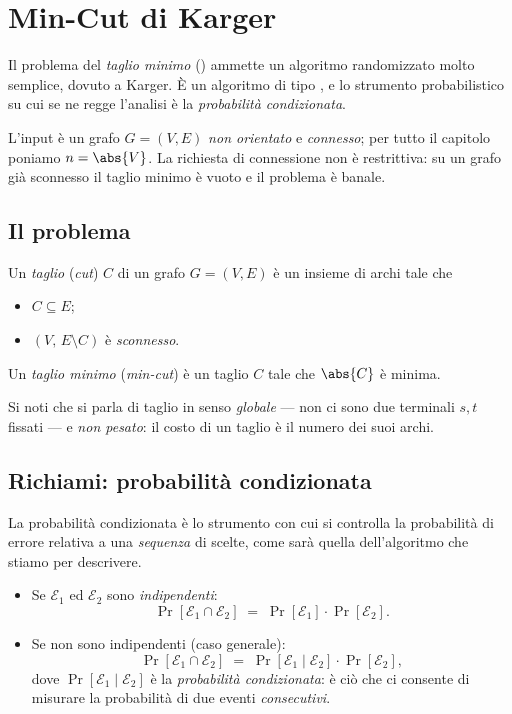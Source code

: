 \chapter{Min-Cut di Karger}

Il problema del \emph{taglio minimo} (\mincut) ammette un algoritmo randomizzato molto
semplice, dovuto a Karger. È un algoritmo di tipo \MonteCarlo, e lo strumento
probabilistico su cui se ne regge l'analisi è la \emph{probabilità condizionata}.

L'input è un grafo $G=(V,E)$ \emph{non orientato} e \emph{connesso}; per tutto il capitolo
poniamo $n=\abs{V}$. La richiesta di connessione non è restrittiva: su un grafo già
sconnesso il taglio minimo è vuoto e il problema è banale.

\section{Il problema}


\begin{definizione}[Taglio]\label{def:taglio}
Un \emph{taglio} (\emph{cut}) $C$ di un grafo $G=(V,E)$ è un insieme di archi tale che
\begin{itemize}
  \item $C\subseteq E$;
  \item $(V,\,E\setminus C)$ è \emph{sconnesso}.
\end{itemize}
\end{definizione}

\begin{definizione}\label{def:min-cut}
Un \emph{taglio minimo} (\emph{min-cut}) è un taglio $C$ tale che $\abs{C}$ è minima.
\end{definizione}

Si noti che si parla di taglio in senso \emph{globale} — non ci sono due terminali $s,t$
fissati — e \emph{non pesato}: il costo di un taglio è il numero dei suoi archi.

\section{Richiami: probabilità condizionata}

La probabilità condizionata è lo strumento con cui si controlla la probabilità di errore
relativa a una \emph{sequenza} di scelte, come sarà quella dell'algoritmo che stiamo per
descrivere.

\begin{itemize}
  \item Se $\mathcal{E}_1$ ed $\mathcal{E}_2$ sono \emph{indipendenti}:
  \[
    \Pr[\mathcal{E}_1\cap\mathcal{E}_2]\;=\;\Pr[\mathcal{E}_1]\cdot\Pr[\mathcal{E}_2] .
  \]
  \item Se non sono indipendenti (caso generale):
  \[
    \Pr[\mathcal{E}_1\cap\mathcal{E}_2]\;=\;\Pr[\mathcal{E}_1\mid\mathcal{E}_2]\cdot\Pr[\mathcal{E}_2],
  \]
  dove $\Pr[\mathcal{E}_1\mid\mathcal{E}_2]$ è la \emph{probabilità condizionata}: è ciò che
  ci consente di misurare la probabilità di due eventi \emph{consecutivi}.
\end{itemize}

